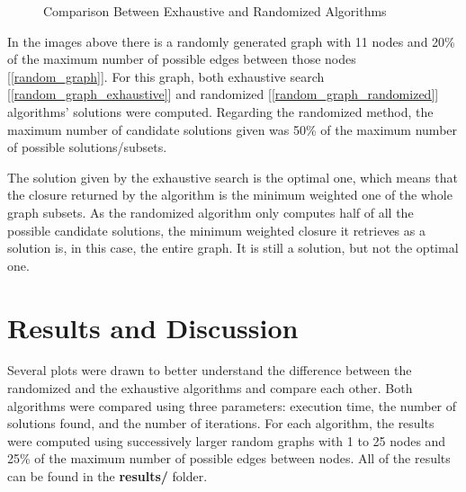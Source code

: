 \documentclass[...]{revdetua}
\begin{document}
\begin{figure}[htp]

\caption{Comparison Between Exhaustive and Randomized Algorithms}

\end{figure}

In the images above there is a randomly generated graph with 11 nodes and 20\% of the maximum number of possible edges between those nodes [\ref{random_graph}]. For this graph, both exhaustive search [\ref{random_graph_exhaustive}] and randomized [\ref{random_graph_randomized}] algorithms' solutions were computed. Regarding the randomized method, the maximum number of candidate solutions given was 50\% of the maximum number of possible solutions/subsets.

The solution given by the exhaustive search is the optimal one, which means that the closure returned by the algorithm is the minimum weighted one of the whole graph subsets. As the randomized algorithm only computes half of all the possible candidate solutions, the minimum weighted closure it retrieves as a solution is, in this case, the entire graph. It is still a solution, but not the optimal one.

\section{Results and Discussion}

Several plots were drawn to better understand the difference between the randomized and the exhaustive algorithms and compare each other. Both algorithms were compared using three parameters: execution time, the number of solutions found, and the number of iterations. For each algorithm, the results were computed using successively larger random graphs with 1 to 25 nodes and 25\% of the maximum number of possible edges between nodes.
All of the results can be found in the \textbf{results/}
folder.
\end{document}
